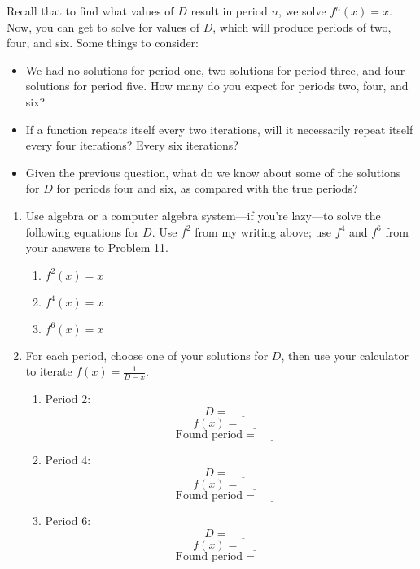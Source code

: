 \documentclass[../gatm.tex]{subfiles}
\begin{document}
\noindent Recall that to find what values of $D$ result in period $n$, we solve $f^n(x)=x$. Now, you can get to solve for values of $D$, which will produce periods of two, four, and six. Some things to consider:

\begin{itemize}
\item We had no solutions for period one, two solutions for period three, and four solutions for period five. How many do you expect for periods two, four, and six?
\item If a function repeats itself every two iterations, will it necessarily repeat itself every four iterations? Every six iterations?
\item Given the previous question, what do we know about some of the solutions for $D$ for periods four and six, as compared with the true periods?
\end{itemize}
\begin{enumerate}
\setcounter{enumi}{\value{problem_i}}
\item Use algebra or a computer algebra system---if you're lazy---to solve the following equations for $D$. Use $f^2$ from my writing above; use $f^4$ and $f^6$ from your answers to Problem 11.
\begin{multicols}{3}
\begin{enumerate}
\item $f^2(x)=x$
\item $f^4(x)=x$
\item $f^6(x)=x$
\end{enumerate}
\end{multicols}
\item For each period, choose one of your solutions for $D$, then use your calculator to iterate $f(x)=\frac{1}{D-x}$.
\begin{multicols}{3}
\begin{enumerate}
\item Period 2: $$D=\underline{\phantom{00000}}$$ $$f(x)=\underline{\phantom{00000}}$$ $$\text{Found period}=\underline{\phantom{00000}}$$
\item Period 4: $$D=\underline{\phantom{00000}}$$ $$f(x)=\underline{\phantom{00000}}$$ $$\text{Found period}=\underline{\phantom{00000}}$$
\item Period 6: $$D=\underline{\phantom{00000}}$$ $$f(x)=\underline{\phantom{00000}}$$ $$\text{Found period}=\underline{\phantom{00000}}$$
\end{enumerate}
\end{multicols}
\setcounter{problem_i}{\value{enumi}}
\end{enumerate}
\end{document}
